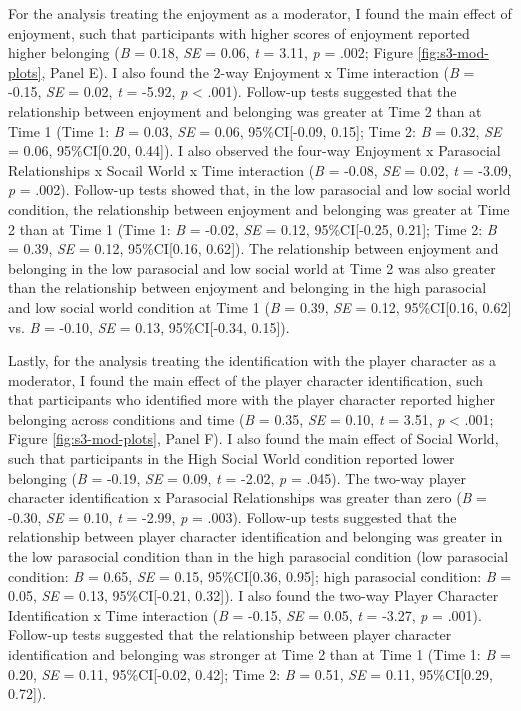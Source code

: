 \documentclass[
]{udthesis}
\begin{document}
For the analysis treating the enjoyment as a moderator, I found the main
effect of enjoyment, such that participants with higher scores of
enjoyment reported higher belonging
(\emph{B} = 0.18, \emph{SE} = 0.06, \emph{t} = 3.11, \emph{p} = .002; Figure
\ref{fig:s3-mod-plots}, Panel E). I also found the
2-way Enjoyment x Time interaction
(\emph{B} = -0.15, \emph{SE} = 0.02, \emph{t} = -5.92, \emph{p} \textless{} .001). Follow-up
tests suggested that the relationship between enjoyment and belonging
was greater at Time 2 than at Time 1 (Time 1:
\emph{B} = 0.03, \emph{SE} = 0.06, 95\%CI{[}-0.09, 0.15{]}; Time 2:
\emph{B} = 0.32, \emph{SE} = 0.06, 95\%CI{[}0.20, 0.44{]}). I also observed the four-way
Enjoyment x Parasocial Relationships x Socail World x Time interaction
(\emph{B} = -0.08, \emph{SE} = 0.02, \emph{t} = -3.09, \emph{p} = .002).
Follow-up tests showed that, in the low parasocial and low social world
condition, the relationship between enjoyment and belonging was greater
at Time 2 than at Time 1 (Time 1:
\emph{B} = -0.02, \emph{SE} = 0.12, 95\%CI{[}-0.25, 0.21{]};
Time 2:
\emph{B} = 0.39, \emph{SE} = 0.12, 95\%CI{[}0.16, 0.62{]}).
The relationship between enjoyment and belonging in the low parasocial
and low social world at Time 2 was also greater than the relationship
between enjoyment and belonging in the high parasocial and low social
world condition at Time 1
(\emph{B} = 0.39, \emph{SE} = 0.12, 95\%CI{[}0.16, 0.62{]}
vs.
\emph{B} = -0.10, \emph{SE} = 0.13, 95\%CI{[}-0.34, 0.15{]}).

Lastly, for the analysis treating the identification with the player
character as a moderator, I found the main effect of the player character
identification, such that participants who identified more with the
player character reported higher belonging across conditions and time
(\emph{B} = 0.35, \emph{SE} = 0.10, \emph{t} = 3.51, \emph{p} \textless{} .001; Figure
\ref{fig:s3-mod-plots}, Panel F). I
also found the main effect of Social World, such that participants in the
High Social World condition reported lower belonging
(\emph{B} = -0.19, \emph{SE} = 0.09, \emph{t} = -2.02, \emph{p} = .045). The two-way
player character identification x Parasocial Relationships was greater
than zero
(\emph{B} = -0.30, \emph{SE} = 0.10, \emph{t} = -2.99, \emph{p} = .003).
Follow-up tests suggested that the relationship between player character
identification and belonging was greater in the low parasocial condition
than in the high parasocial condition (low parasocial condition:
\emph{B} = 0.65, \emph{SE} = 0.15, 95\%CI{[}0.36, 0.95{]}; high parasocial
condition: \emph{B} = 0.05, \emph{SE} = 0.13, 95\%CI{[}-0.21, 0.32{]}). I also
found the two-way Player Character Identification x Time interaction
(\emph{B} = -0.15, \emph{SE} = 0.05, \emph{t} = -3.27, \emph{p} = .001).
Follow-up tests suggested that the relationship between player character
identification and belonging was stronger at Time 2 than at Time 1 (Time
1: \emph{B} = 0.20, \emph{SE} = 0.11, 95\%CI{[}-0.02, 0.42{]}; Time 2:
\emph{B} = 0.51, \emph{SE} = 0.11, 95\%CI{[}0.29, 0.72{]}).
\end{document}
